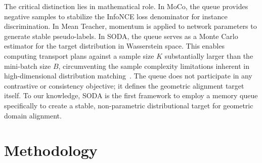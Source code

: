 \documentclass[preprint,12pt]{elsarticle}
\begin{document}
The critical distinction lies in mathematical role. In MoCo, the queue provides negative samples to stabilize the InfoNCE loss denominator for instance discrimination. In Mean Teacher, momentum is applied to network parameters to generate stable pseudo-labels. In SODA, the queue serves as a Monte Carlo estimator for the target distribution in Wasserstein space. This enables computing transport plans against a sample size $K$ substantially larger than the mini-batch size $B$, circumventing the sample complexity limitations inherent in high-dimensional distribution matching~\citep{dong2020how}. The queue does not participate in any contrastive or consistency objective; it defines the geometric alignment target itself. To our knowledge, SODA is the first framework to employ a memory queue specifically to create a stable, non-parametric distributional target for geometric domain alignment. \section{Methodology}
\label{sec:methodology}
\usetikzlibrary{
    arrows.meta,
    backgrounds,
    calc,
    matrix,
    positioning,
    shapes.geometric
}

\end{document}
